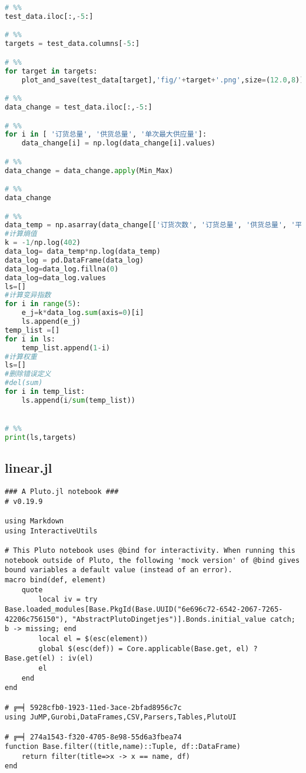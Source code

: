 \begin{appendices}
\begin{lstlisting}[language=python]
# %%
test_data.iloc[:,-5:]

# %%
targets = test_data.columns[-5:]

# %%
for target in targets:
    plot_and_save(test_data[target],'fig/'+target+'.png',size=(12.0,8))

# %%
data_change = test_data.iloc[:,-5:]

# %%
for i in [ '订货总量', '供货总量', '单次最大供应量']:
    data_change[i] = np.log(data_change[i].values)

# %%
data_change = data_change.apply(Min_Max)

# %%
data_change

# %%
data_temp = np.asarray(data_change[['订货次数', '订货总量', '供货总量', '平均供货偏差', '单次最大供应量']])
#计算熵值
k = -1/np.log(402)
data_log= data_temp*np.log(data_temp)
data_log = pd.DataFrame(data_log)
data_log=data_log.fillna(0)
data_log=data_log.values
ls=[]
#计算变异指数
for i in range(5):
    e_j=k*data_log.sum(axis=0)[i]
    ls.append(e_j)
temp_list =[]
for i in ls:
    temp_list.append(1-i)
#计算权重
ls=[]
#删除错误定义
#del(sum)
for i in temp_list:
    ls.append(i/sum(temp_list))


# %%
print(ls,targets)

\end{lstlisting}

\subsection{linear.jl}

\begin{lstlisting}
### A Pluto.jl notebook ###
# v0.19.9

using Markdown
using InteractiveUtils

# This Pluto notebook uses @bind for interactivity. When running this notebook outside of Pluto, the following 'mock version' of @bind gives bound variables a default value (instead of an error).
macro bind(def, element)
    quote
        local iv = try Base.loaded_modules[Base.PkgId(Base.UUID("6e696c72-6542-2067-7265-42206c756150"), "AbstractPlutoDingetjes")].Bonds.initial_value catch; b -> missing; end
        local el = $(esc(element))
        global $(esc(def)) = Core.applicable(Base.get, el) ? Base.get(el) : iv(el)
        el
    end
end

# ╔═╡ 5928cfb0-1923-11ed-3ace-2bfad8956c7c
using JuMP,Gurobi,DataFrames,CSV,Parsers,Tables,PlutoUI

# ╔═╡ 274a1543-f320-4705-8e98-55d6a3fbea74
function Base.filter((title,name)::Tuple, df::DataFrame)
	return filter(title=>x -> x == name, df)
end


\end{lstlisting}
\end{appendices}
